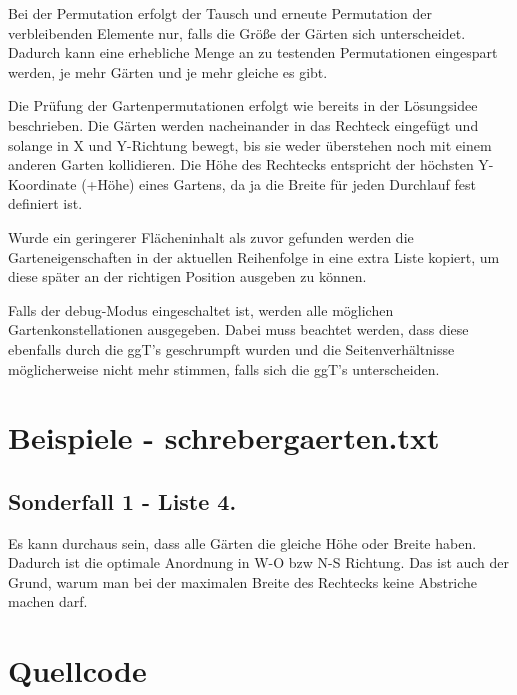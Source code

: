 \documentclass[a4paper,10pt,ngerman]{scrartcl}
\begin{document}
Bei der Permutation erfolgt der Tausch und erneute Permutation der verbleibenden Elemente nur, falls die Größe der Gärten sich unterscheidet. Dadurch kann eine erhebliche Menge an zu testenden Permutationen eingespart werden, je mehr Gärten und je mehr gleiche es gibt.

Die Prüfung der Gartenpermutationen erfolgt wie bereits in der Lösungsidee beschrieben.
Die Gärten werden nacheinander in das Rechteck eingefügt und solange in X und Y-Richtung bewegt, bis sie weder überstehen noch mit einem anderen Garten kollidieren. Die Höhe des Rechtecks entspricht der höchsten Y-Koordinate (+Höhe) eines Gartens, da ja die Breite für jeden Durchlauf fest definiert ist.

Wurde ein geringerer Flächeninhalt als zuvor gefunden werden die Garteneigenschaften in der aktuellen Reihenfolge in eine extra Liste kopiert, um diese später an der richtigen Position ausgeben zu können.

Falls der debug-Modus eingeschaltet ist, werden alle möglichen Gartenkonstellationen ausgegeben. Dabei muss beachtet werden, dass diese ebenfalls durch die ggT's geschrumpft wurden und die Seitenverhältnisse möglicherweise nicht mehr stimmen, falls sich die ggT's unterscheiden.

\section[Beispiele]{Beispiele - schrebergaerten.txt}

\subsection[Sonderfall 1]{Sonderfall 1 - Liste 4.}
Es kann durchaus sein, dass alle Gärten die gleiche Höhe oder Breite haben. Dadurch ist die optimale Anordnung in W-O bzw N-S Richtung. Das ist auch der Grund, warum man bei der maximalen Breite des Rechtecks keine Abstriche machen darf.

\section{Quellcode}
\end{document}
